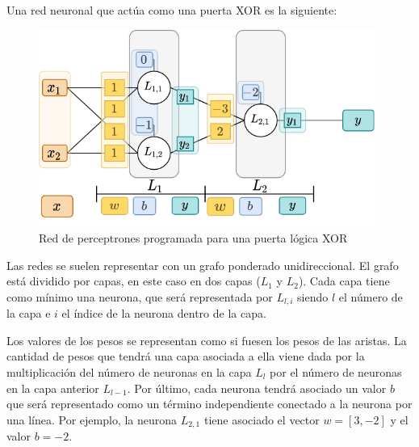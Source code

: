 Una red neuronal que actúa como una puerta XOR es la siguiente:
\begin{figure}[H]
    \centering
    \includegraphics[width=11cm]{images/state-of-art/perceptron/xor.png}
    \caption{Red de perceptrones programada para una puerta lógica XOR}
    \label{fig:xorgatenetwork}
\end{figure}

Las redes se suelen representar con un grafo ponderado unidireccional. El grafo está dividido por capas, en este caso en dos capas ($L_1$ y $L_2$). Cada capa tiene como mínimo una neurona, que será representada por $L_{l,i}$ siendo $l$ el número de la capa e $i$ el índice de la neurona dentro de la capa. 
\newline

Los valores de los pesos se representan como si fuesen los pesos de las aristas. La cantidad de pesos que tendrá una capa asociada a ella viene dada por la multiplicación del número de neuronas en la capa $L_{l}$ por el número de neuronas en la capa anterior $L_{l-1}$. Por último, cada neurona tendrá asociado un valor $b$ que será representado como un término independiente conectado a la neurona por una línea. Por ejemplo, la neurona $L_{2,1}$ tiene asociado el vector $w = [3, -2]$ y el valor $b = -2$.
\newline

